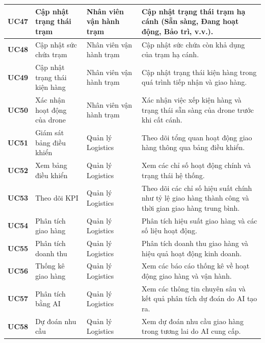 \begin{longtable}{|p{1.2cm}|p{3.5cm}|p{2.8cm}|p{6.5cm}|}
\textbf{UC47} & Cập nhật trạng thái trạm & Nhân viên vận hành trạm &
Cập nhật trạng thái trạm hạ cánh (Sẵn sàng, Đang hoạt động, Bảo trì, v.v.). \\
\hline

\textbf{UC48} & Cập nhật sức chứa trạm & Nhân viên vận hành trạm &
Cập nhật sức chứa còn khả dụng của trạm hạ cánh. \\
\hline

\textbf{UC49} & Cập nhật trạng thái kiện hàng & Nhân viên vận hành trạm &
Cập nhật trạng thái kiện hàng trong quá trình tiếp nhận và giao hàng. \\
\hline

\textbf{UC50} & Xác nhận hoạt động của drone & Nhân viên vận hành trạm &
Xác nhận việc xếp kiện hàng và trạng thái sẵn sàng của drone trước khi cất cánh. \\
\hline

\textbf{UC51} & Giám sát bảng điều khiển & Quản lý Logistics &
Theo dõi tổng quan hoạt động giao hàng thông qua bảng điều khiển. \\
\hline

\textbf{UC52} & Xem bảng điều khiển & Quản lý Logistics &
Xem các chỉ số hoạt động chính và trạng thái hệ thống. \\
\hline

\textbf{UC53} & Theo dõi KPI & Quản lý Logistics &
Theo dõi các chỉ số hiệu suất chính như tỷ lệ giao hàng thành công và thời gian giao hàng trung bình. \\
\hline

\textbf{UC54} & Phân tích giao hàng & Quản lý Logistics &
Phân tích hiệu suất giao hàng và các số liệu hoạt động. \\
\hline

\textbf{UC55} & Phân tích doanh thu & Quản lý Logistics &
Phân tích doanh thu giao hàng và hiệu quả hoạt động kinh doanh. \\
\hline

\textbf{UC56} & Thống kê giao hàng & Quản lý Logistics &
Xem các báo cáo thống kê về hoạt động giao hàng và vận hành. \\
\hline

\textbf{UC57} & Phân tích bằng AI & Quản lý Logistics &
Xem các thông tin chuyên sâu và kết quả phân tích dự đoán do AI tạo ra. \\
\hline

\textbf{UC58} & Dự đoán nhu cầu & Quản lý Logistics &
Xem dự đoán nhu cầu giao hàng trong tương lai do AI cung cấp. \\
\hline


\end{longtable}
